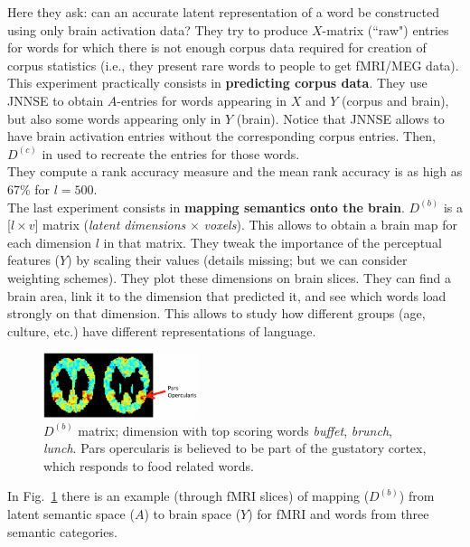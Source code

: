 Here they ask: can an accurate latent representation of a word be constructed using only brain activation data? They try to produce $X$-matrix (``raw") entries for words for which there is not enough corpus data required for creation of corpus statistics (i.e., they present rare words to people to get fMRI/MEG data). This experiment practically consists in \textbf{predicting corpus data}. They use JNNSE to obtain $A$-entries for words appearing in $X$ and $Y$ (corpus and brain), but also some words appearing only in $Y$ (brain). Notice that JNNSE allows to have brain activation entries without the corresponding corpus entries.
Then, $D^{(c)}$ in used to recreate the entries for those words.\\
They compute a rank accuracy measure and the mean rank accuracy is as high as 67\% for $l=500$.\\

The last experiment consists in \textbf{mapping semantics onto the brain}. $D^{(b)}$ is a [$l \times v$] matrix (\textit{latent dimensions} $\times$ \textit{voxels}). This allows to obtain a brain map for each dimension $l$ in that matrix. They tweak the importance of the perceptual features ($Y$) by scaling their values (details missing; but we can consider weighting schemes). They plot these dimensions on brain slices. They can find a brain area, link it to the dimension that predicted it, and see which words load strongly on that dimension. This allows to study how different groups (age, culture, etc.) have different representations of language.

\begin{figure}
  \centering
  \includegraphics[width=0.4\textwidth]{images/jnnse_4.png}
  \caption{$D^{(b)}$ matrix; dimension with top scoring words \textit{buffet}, \textit{brunch}, \textit{lunch}. Pars opercularis is believed to be part of the gustatory cortex, which responds to food related words.}
  \label{fig:jnnse_4}
\end{figure}
In Fig.~\ref{fig:jnnse_4} there is an example (through fMRI slices) of mapping ($D^{(b)}$) from latent semantic space ($A$) to brain space ($Y$) for fMRI and words from three semantic categories.\\

